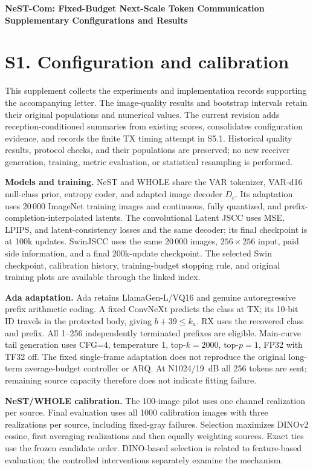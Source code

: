 \documentclass[11pt,letterpaper]{article}
\newcommand{\Dc}{D_c}
\begin{document}
\begin{center}\Large\bfseries NeST-Com: Fixed-Budget Next-Scale Token Communication\\[4pt]\large Supplementary Configurations and Results\end{center}
\section*{S1. Configuration and calibration}
This supplement collects the experiments and implementation records supporting the accompanying letter. The image-quality results and bootstrap intervals retain their original populations and numerical values. The current revision adds reception-conditioned summaries from existing scores, consolidates configuration evidence, and records the finite TX timing attempt in S5.1. Historical quality results, protocol checks, and their populations are preserved; no new receiver generation, training, metric evaluation, or statistical resampling is performed.

\textbf{Models and training.} NeST and WHOLE share the VAR tokenizer, VAR-d16 null-class prior, entropy coder, and adapted image decoder $\Dc$. Its adaptation uses 20\,000 ImageNet training images and continuous, fully quantized, and prefix-completion-interpolated latents. The convolutional Latent JSCC uses MSE, LPIPS, and latent-consistency losses and the same decoder; its final checkpoint is at 100k updates. SwinJSCC uses the same 20\,000 images, $256\times256$ input, paid side information, and a final 200k-update checkpoint. The selected Swin checkpoint, calibration history, training-budget stopping rule, and original training plots are available through the linked index.

\textbf{Ada adaptation.} Ada retains LlamaGen-L/VQ16 and genuine autoregressive prefix arithmetic coding. A fixed ConvNeXt predicts the class at TX; its 10-bit ID travels in the protected body, giving $b+39\leq k_a$. RX uses the recovered class and prefix. All 1--256 independently terminated prefixes are eligible. Main-curve tail generation uses CFG=4, temperature 1, top-$k=2000$, top-$p=1$, FP32 with TF32 off. The fixed single-frame adaptation does not reproduce the original long-term average-budget controller or ARQ. At N1024/19~dB all 256 tokens are sent; remaining source capacity therefore does not indicate fitting failure.

\textbf{NeST/WHOLE calibration.} The 100-image pilot uses one channel realization per source. Final evaluation uses all 1000 calibration images with three realizations per source, including fixed-gray failures. Selection maximizes DINOv2 cosine, first averaging realizations and then equally weighting sources. Exact ties use the frozen candidate order. DINO-based selection is related to feature-based evaluation; the controlled interventions separately examine the mechanism.
\end{document}
